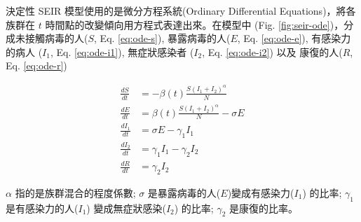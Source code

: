 

\begin{tcolorbox}[title=決定性 SEIR 模型 (Deterministic SEIR)]

決定性 SEIR 模型使用的是微分方程系統(Ordinary Differential Equations)，將各族群在 $t$ 時間點的改變傾向用方程式表達出來。在模型中 (Fig. \ref{fig:seir-ode})，分成未接觸病毒的人($S$, Eq. \ref{eq:ode-s}), 暴露病毒的人($E$, Eq. \ref{eq:ode-e}), 有感染力的病人 ($I_1$, Eq. \ref{eq:ode-i1}), 無症狀感染者 ($I_2$, Eq. \ref{eq:ode-i2}) 以及 康復的人($R$, Eq. \ref{eq:ode-r})


\begin{align} 
    \frac{dS}{dt} &= -\beta(t)\frac{S(I_1 + I_2)^{\alpha}}{N} \label{eq:ode-s}\\
    \frac{dE}{dt} &= \beta(t)\frac{S(I_1 + I_2)^{\alpha}}{N} - \sigma E \label{eq:ode-e}\\
    \frac{dI_1}{dt} &= \sigma E - \gamma_1 I_1 \label{eq:ode-i1}\\
    \frac{dI_2}{dt} &= \gamma_1 I_1 - \gamma_2 I_2 \label{eq:ode-i2}\\
    \frac{dR}{dt} &= \gamma_2 I_2 \label{eq:ode-r} 
\end{align}

$\alpha$ 指的是族群混合的程度係數; $\sigma$ 是暴露病毒的人($E$)變成有感染力($I_1$) 的比率; $\gamma_1$ 是有感染力的人($I_1$) 變成無症狀感染($I_2$) 的比率; $\gamma_2$ 是康復的比率。

\end{tcolorbox}
